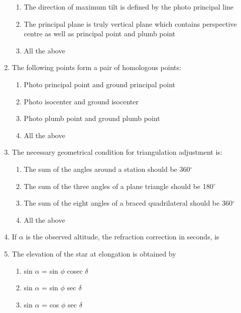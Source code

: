 \documentclass[11pt,a4paper]{article}
\begin{document}
\begin{enumerate}
\begin{enumerate}[label=\Alph*.]
\item{The direction of maximum tilt is defined by the photo principal line}
\item{The principal plane is truly vertical plane which contains perspective centre as well as principal point and plumb point}
\item{All the above}
\end{enumerate}
\item{The following points form a pair of homologous points:}
\begin{enumerate}[label=\Alph*.]
\item{Photo principal point and ground principal point}
\item{Photo isocenter and ground isocenter}
\item{Photo plumb point and ground plumb point}
\item{All the above}
\end{enumerate}
\item{The necessary geometrical condition for triangulation adjustment is:}
\begin{enumerate}[label=\Alph*.]
\item{The sum of the angles around a station should be 360$^\circ$}
\item{The sum of the three angles of a plane triangle should be 180$^\circ$}
\item{The sum of the eight angles of a braced quadrilateral should be 360$^\circ$}
\item{All the above}
\end{enumerate}
\item{If $\alpha$ is the observed altitude, the refraction correction in seconds, is
}
\\
\item{The elevation of the star at elongation is obtained by}
\begin{enumerate}[label=\Alph*.]
\item{sin $\alpha$ = sin $\phi$ cosec $\delta$}
\item{sin $\alpha$ = sin $\phi$ sec $\delta$}
\item{sin $\alpha$ = cos $\phi$ sec $\delta$}

\end{enumerate}
\end{enumerate}
\end{document}
